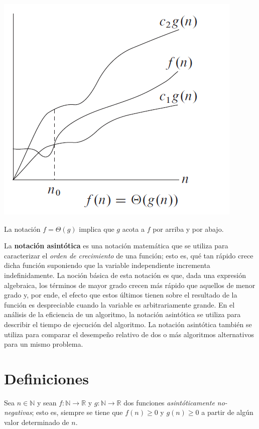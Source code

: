\begin{marginfigure}
  \includegraphics[width=\linewidth]{figuras/big-theta}
  \caption{La notación \(f=\Theta(g)\) implica que \(g\) acota a \(f\) por arriba y por abajo.}
\end{marginfigure}

La \textbf{notación asintótica} es una notación matemática que se utiliza para caracterizar el \emph{orden de crecimiento} de una función; esto es, qué tan rápido crece dicha función suponiendo que la variable independiente incrementa indefinidamente.
La noción básica de esta notación es que, dada una expresión algebraica, los términos de mayor grado crecen más rápido que aquellos de menor grado y, por ende, el efecto que estos últimos tienen sobre el resultado de la función es despreciable cuando la variable es arbitrariamente grande. 
En el análisis de la eficiencia de un algoritmo, la notación asintótica se utiliza para describir el tiempo de ejecución del algoritmo.
La notación asintótica también se utiliza para comparar el desempeño relativo de dos o más algoritmos alternativos para un mismo problema.

\section{Definiciones}

Sea \(n\in\mathbb{N}\) y sean \(f:\mathbb{N}\to\mathbb{R}\) y \(g:\mathbb{N}\to\mathbb{R}\) dos funciones \emph{asintóticamente no-negativas}; esto es, siempre se tiene que \(f(n)\geq 0\) y \(g(n)\geq 0\) a partir de algún valor determinado de \(n\). 


